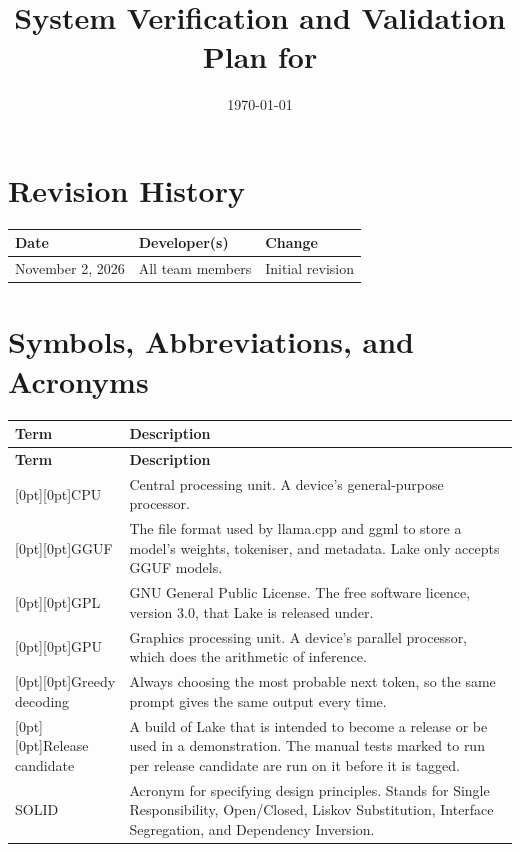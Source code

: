 \documentclass[12pt, titlepage]{article}
\providecommand{\glsentry}[2]{}
\renewcommand{\glsentry}[2]{\raisebox{0pt}[0pt][0pt]{\hypertarget{gls:#1}{}}#2}
\begin{document}
\title{System Verification and Validation Plan for \progname{}} 
\author{\authname}
\date{\today}
	
\maketitle


\section*{Revision History}

\begin{tabularx}{\textwidth}{llX}
\toprule
\textbf{Date} & \textbf{Developer(s)} & \textbf{Change}\\
\midrule
November 2, 2026 & All team members & Initial revision\\
\bottomrule
\end{tabularx}

\newpage

\tableofcontents

\listoftables

\newpage

\section{Symbols, Abbreviations, and Acronyms}

\renewcommand{\arraystretch}{1.2}
\begin{longtable}{@{}p{} p{}@{}}
  \toprule
  \textbf{Term} & \textbf{Description}\\
  \midrule
  \endfirsthead
  \toprule
  \textbf{Term} & \textbf{Description}\\
  \midrule
  \endhead
  \bottomrule
  \endfoot
  \bottomrule
  \endlastfoot

  \glsentry{cpu}{CPU} & Central processing unit. A device's general-purpose processor.\\
  \glsentry{gguf}{GGUF} & The file format used by llama.cpp and ggml to store a model's weights, tokeniser, and metadata. Lake only accepts GGUF models.\\
  \glsentry{gpl}{GPL} & GNU General Public License. The free software licence, version 3.0, that Lake is released under.\\
  \glsentry{gpu}{GPU} & Graphics processing unit. A device's parallel processor, which does the arithmetic of inference.\\
  \glsentry{greedy}{Greedy decoding} & Always choosing the most probable next token, so the same prompt gives the same output every time.\\
  \glsentry{rc}{Release candidate} & A build of Lake that is intended to become a release or be used in a demonstration. The manual tests marked to run per release candidate are run on it before it is tagged.\\
  SOLID\label{SOLID} & Acronym for specifying design principles. Stands for Single Responsibility, Open/Closed, Liskov Substitution, Interface Segregation, and Dependency Inversion. \\
\end{longtable}
\end{document}
